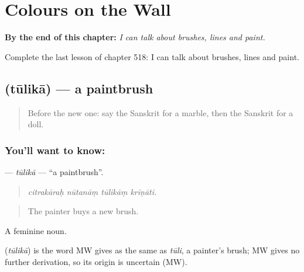 
\chapter{Colours on the Wall}
\label{ch:sa-colours-on-the-wall}

\begin{chapteropening}
\textbf{By the end of this chapter:} \emph{I can talk about brushes, lines and paint.}

Complete the last lesson of chapter 518: I can talk about brushes, lines and paint.
\end{chapteropening}

\section[\texorpdfstring{\sk{तूलिका} (tūlikā)}{तूलिका (tūlikā)}]{ (tūlikā) — a paintbrush}

\label{lesson:SA-C518-tulika}



\begin{quote}
Before the new one: say the Sanskrit for a marble, then the Sanskrit for a doll.
\end{quote}

\subsection*{You'll want to know: }
\textbf{} — \emph{tūlikā} — \textquotedblleft{}a paintbrush\textquotedblright{}.

\begin{quote}
   
\end{quote}

\begin{quote}
\emph{citrakāraḥ nūtanāṃ tūlikāṃ krīṇāti.}
\end{quote}

\begin{quote}
The painter buys a new brush.
\end{quote}

A feminine noun.

\begin{cousinweb}
\textbf{} (\emph{tūlikā}) is the word MW gives as the same as \emph{tūli}, a painter's brush; MW gives no further derivation, so its origin is uncertain (MW).
\end{cousinweb}

